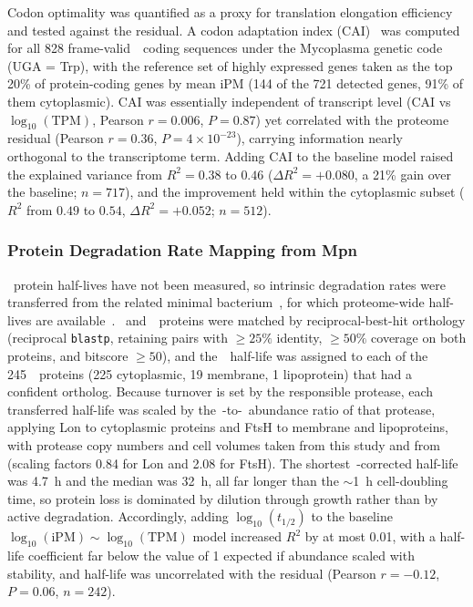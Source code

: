 Codon optimality was quantified as a proxy for translation elongation efficiency and tested against the residual.
A codon adaptation index (CAI)~\cite{sharp_codon_1987} was computed for all 828 frame-valid~\syn~coding sequences under the Mycoplasma genetic code (UGA = Trp), with the reference set of highly expressed genes taken as the top 20\% of protein-coding genes by mean iPM (144 of the 721 detected genes, 91\% of them cytoplasmic).
CAI was essentially independent of transcript level (CAI vs $\log_{10}(\text{TPM})$, Pearson $r = 0.006$, $P = 0.87$) yet correlated with the proteome residual (Pearson $r = 0.36$, $P = 4 \times 10^{-23}$), carrying information nearly orthogonal to the transcriptome term.
Adding CAI to the baseline model raised the explained variance from $R^{2} = 0.38$ to $0.46$ ($\Delta R^{2} = +0.080$, a 21\% gain over the baseline; $n = 717$), and the improvement held within the cytoplasmic subset ($R^{2}$ from $0.49$ to $0.54$, $\Delta R^{2} = +0.052$; $n = 512$).

\subsubsection{Protein Degradation Rate Mapping from Mpn}

\syn~protein half-lives have not been measured, so intrinsic degradation rates were transferred from the related minimal bacterium~\Mpn, for which proteome-wide half-lives are available~\cite{burgos_protein_2020}.
\syn~and~\mpn~proteins were matched by reciprocal-best-hit orthology (reciprocal \texttt{blastp}, retaining pairs with $\geq 25\%$ identity, $\geq 50\%$ coverage on both proteins, and bitscore $\geq 50$), and the~\mpn~half-life was assigned to each of the 245~\syn~proteins (225 cytoplasmic, 19 membrane, 1 lipoprotein) that had a confident ortholog.
Because turnover is set by the responsible protease, each transferred half-life was scaled by the~\mpn-to-\syn~abundance ratio of that protease, applying Lon to cytoplasmic proteins and FtsH to membrane and lipoproteins, with protease copy numbers and cell volumes taken from this study and from~\mpn~\cite{maier_quantification_2011} (scaling factors 0.84 for Lon and 2.08 for FtsH).
The shortest~\syn-corrected half-life was 4.7~h and the median was 32~h, all far longer than the $\sim$1~h cell-doubling time, so protein loss is dominated by dilution through growth rather than by active degradation.
Accordingly, adding $\log_{10}(t_{1/2})$ to the baseline $\log_{10}(\text{iPM}) \sim \log_{10}(\text{TPM})$ model increased $R^{2}$ by at most 0.01, with a half-life coefficient far below the value of 1 expected if abundance scaled with stability, and half-life was uncorrelated with the residual (Pearson $r = -0.12$, $P = 0.06$, $n = 242$).

